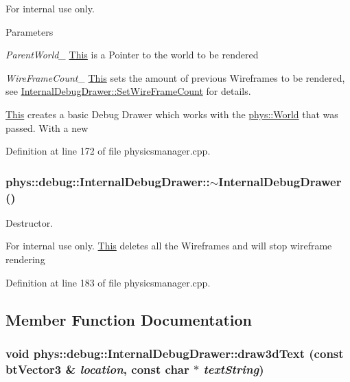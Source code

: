 \begin{DoxyInternal}{For internal use only.}

\begin{DoxyParams}{Parameters}
\item[{\em ParentWorld\_\-}]\hyperlink{structThis}{This} is a Pointer to the world to be rendered \item[{\em WireFrameCount\_\-}]\hyperlink{structThis}{This} sets the amount of previous Wireframes to be rendered, see \hyperlink{classphys_1_1debug_1_1InternalDebugDrawer_a76922fda7bb3b59d301e50d67e4f3c72}{InternalDebugDrawer::SetWireFrameCount} for details.\end{DoxyParams}
\hyperlink{structThis}{This} creates a basic Debug Drawer which works with the \hyperlink{classphys_1_1World}{phys::World} that was passed. With a new \end{DoxyInternal}


Definition at line 172 of file physicsmanager.cpp.

\hypertarget{classphys_1_1debug_1_1InternalDebugDrawer_a9b5cb5ec48541effddb305de12508323}{
\subsubsection[{$\sim$InternalDebugDrawer}]{\setlength{\rightskip}{0pt plus 5cm}phys::debug::InternalDebugDrawer::$\sim$InternalDebugDrawer ()}}
\label{db/d27/classphys_1_1debug_1_1InternalDebugDrawer_a9b5cb5ec48541effddb305de12508323}


Destructor. 

\begin{DoxyInternal}{For internal use only.}
\hyperlink{structThis}{This} deletes all the Wireframes and will stop wireframe rendering \end{DoxyInternal}


Definition at line 183 of file physicsmanager.cpp.



\subsection{Member Function Documentation}
\hypertarget{classphys_1_1debug_1_1InternalDebugDrawer_a1266d3fad8868ade2d515e9c92e76b4a}{
\subsubsection[{draw3dText}]{\setlength{\rightskip}{0pt plus 5cm}void phys::debug::InternalDebugDrawer::draw3dText (const btVector3 \& {\em location}, \/  const char $\ast$ {\em textString})}}
\label{db/d27/classphys_1_1debug_1_1InternalDebugDrawer_a1266d3fad8868ade2d515e9c92e76b4a}


